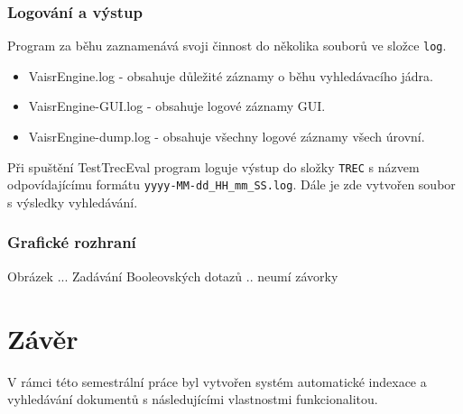 \documentclass[12pt, a4paper]{article}
\begin{document}
\subsubsection{Logování a výstup}

Program za běhu zaznamenává svoji činnost do několika souborů ve složce \texttt{log}. 
\begin{itemize}
\item VaisrEngine.log - obsahuje důležité záznamy o běhu vyhledávacího jádra.
\item VaisrEngine-GUI.log - obsahuje logové záznamy GUI.
\item VaisrEngine-dump.log - obsahuje všechny logové záznamy všech úrovní.
\end{itemize}

Při spuštění TestTrecEval program loguje výstup do složky \texttt{TREC} s názvem odpovídajícímu formátu \texttt{yyyy-MM-dd\_HH\_mm\_SS.log}. Dále je zde vytvořen soubor s výsledky vyhledávání.

\subsubsection{Grafické rozhraní}

Obrázek ...
Zadávání Booleovských dotazů .. neumí závorky

\section{Závěr}

V rámci této semestrální práce byl vytvořen systém automatické indexace a vyhledávání dokumentů s následujícími vlastnostmi funkcionalitou.
\end{document}
